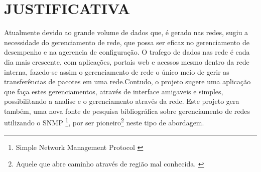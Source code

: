 \chapter{JUSTIFICATIVA}

\par Atualmente devido ao grande volume de dados que, é gerado nas redes,
sugiu a necessidade do gerenciamento de rede, que possa ser eficaz no
gerenciamento de desempenho e na agerencia de configuração. O trafego de dados
nas rede é cada dia mais crescente, com aplicações, portais web e acessos mesmo
dentro da rede interna, fazedo-se assim o gerenciamento de rede o único meio de
gerir as transferências de pacotes em uma rede.Contudo, o projeto sugere uma
aplicação que faça estes gerenciamentos, através de interface amigaveis e
simples, possibilitando a analise e o gerenciamento através da rede.
Este projeto gera também, uma nova fonte de pesquisa bibliográfica sobre
gerenciamento de redes utilizando o SNMP \footnote{Simple Network Management
Protocol \cite{snmp_essencial}}, por ser pioneiro\footnote{Aquele que abre caminho através de
região mal conhecida. \cite{dic_aurelio}} neste tipo de abordagem.
